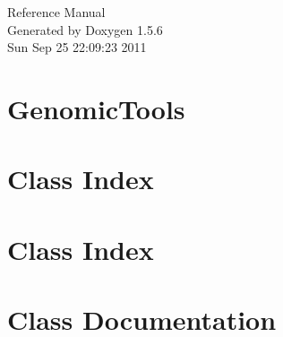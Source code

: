 \documentclass[a4paper]{book}
\begin{document}
\begin{titlepage}
\vspace*{7cm}
\begin{center}
{\Large Reference Manual}\\
\vspace*{1cm}
{\large Generated by Doxygen 1.5.6}\\
\vspace*{0.5cm}
{\small Sun Sep 25 22:09:23 2011}\\
\end{center}
\end{titlepage}
\clearemptydoublepage
{}
\tableofcontents
\clearemptydoublepage
{}
\chapter{GenomicTools}
\label{index}\hypertarget{index}{}
\chapter{Class Index}

\chapter{Class Index}

\chapter{Class Documentation}

















\printindex
\end{document}
